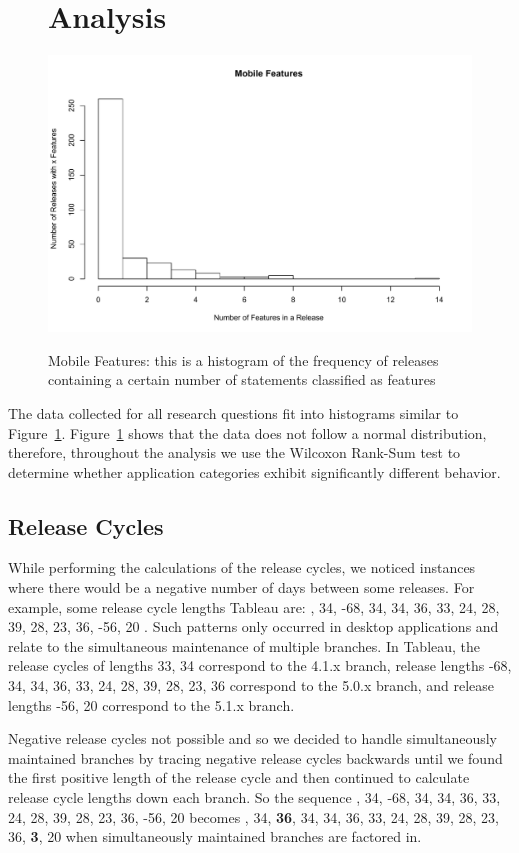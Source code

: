 \documentclass{acm_proc_article-sp}
\begin{document}
\begin{figure}


\section{Analysis}
	\label{sec:analysis}

\begin{center}
\includegraphics[width=.5\textwidth]{mobileFeaturesHist.pdf}
\label{fig:mobHist}
\caption{Mobile Features: this is a histogram of the frequency of releases containing a certain number of statements classified as features}
\end{center}
\end{figure}


The data collected for all research questions fit into histograms similar to Figure~\ref{fig:mobHist}. 
Figure~\ref{fig:mobHist} shows that the data does not follow a normal distribution, therefore, throughout the analysis we use the Wilcoxon Rank-Sum test to determine whether application categories exhibit significantly different behavior.


\subsection{Release Cycles}
While performing the calculations of the release cycles, we noticed instances where there would be a negative number of days between some releases.
For example, some release cycle lengths Tableau are: , 34, -68, 34, 34, 36, 33, 24, 28, 39, 28, 23, 36, -56, 20 \textellipsis\space . 
Such patterns only occurred in desktop applications and relate to the simultaneous maintenance of multiple branches. 
In Tableau, the release cycles of lengths 33, 34 correspond to the 4.1.x branch, release lengths -68, 34, 34, 36, 33, 24, 28, 39, 28, 23, 36 correspond to the 5.0.x branch, and release lengths -56, 20 correspond to the 5.1.x branch.



Negative release cycles not possible and so we decided to handle simultaneously maintained branches by tracing negative release cycles backwards until we found the first positive length of the release cycle and then continued to calculate release cycle lengths down each branch. 
So the sequence , 34, -68, 34, 34, 36, 33, 24, 28, 39, 28, 23, 36, -56, 20 \textellipsis becomes , 34, \textbf{36}, 34, 34, 36, 33, 24, 28, 39, 28, 23, 36, \textbf{3}, 20 \textellipsis when simultaneously maintained branches are factored in.
\end{document}
